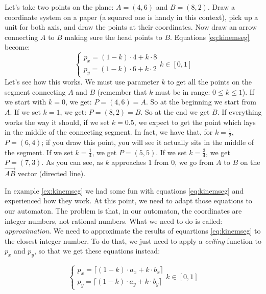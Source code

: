 \begin{example}
\label{ex:kinemseg}
Let's take two points on the plane: $A = (4,6)$ and $B = (8,2)$. Draw a coordinate system
on a paper (a squared one is handy in this context),
pick up a unit for both axis, and draw the points at their coordinates. Now draw an arrow
connecting $A$ to $B$ making sure the head points to $B$. Equations \ref{eq:kinemseg}
become:
\begin{equation*}
\begin{cases}
p_x = (1-k) \cdot 4 + k \cdot 8\\
p_y = (1-k) \cdot 6 + k \cdot 2
\end{cases}
k \in [0,1]
\end{equation*}
Let's see how this works. We must use parameter $k$ to get all the points on the segment
connecting $A$ and $B$ (remember that $k$ must be in range: $0 \leq k \leq 1$). If we
start with $k=0$, we get: $P = (4,6) = A$. So at the beginning we start from $A$. If we
set $k=1$, we get: $P = (8,2) = B$. So at the end we get $B$. If everything works the way
it should, if we set $k=0.5$, we expect to get the point which lays in the middle of the
connecting segment. In fact, we have that, for $k=\frac{1}{2}$, $P = (6,4)$; if you draw
this point, you will see it actually sits in the middle of the segment.
If we set $k=\frac{1}{4}$, we get $P = (5,5)$.
If we set $k=\frac{3}{4}$, we get $P = (7,3)$.
As you can see, as $k$ approaches $1$ from $0$, we go from $A$ to $B$ on
the $\overrightarrow{AB}$ vector (directed line).
\end{example}

In example \ref{ex:kinemseg} we had some fun with equations \ref{eq:kinemseg}
and experienced how they work. At this point, we need to adapt those equations to our automaton.
The problem is that, in our automaton, the coordinates are integer numbers, not rational
numbers. What we need to do is called: \textit{approximation}. We need to approximate
the results of equartions \ref{eq:kinemseg} to the closest integer number.
To do that, we just need to apply a \textit{ceiling} function to $p_x$ and $p_y$, so that we get
these equations instead:

\begin{equation}
\label{eq:kinemsegapprox}
\begin{cases}
p_x = \lceil (1-k) \cdot a_x + k \cdot b_x \rceil\\
p_y = \lceil (1-k) \cdot a_y + k \cdot b_y \rceil
\end{cases}
k \in [0,1]
\end{equation}

